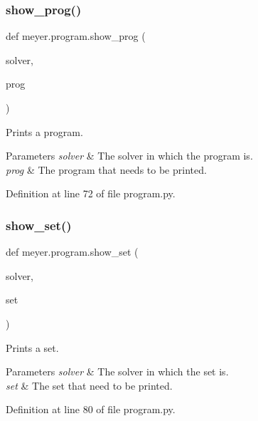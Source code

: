 \subsubsection{\texorpdfstring{show\+\_\+prog()}{show\_prog()}}
{\footnotesize\ttfamily def meyer.\+program.\+show\+\_\+prog (\begin{DoxyParamCaption}\item[{}]{solver,  }\item[{}]{prog }\end{DoxyParamCaption})}



Prints a program. 


\begin{DoxyParams}{Parameters}
{\em solver} & The solver in which the program is. \\
\hline
{\em prog} & The program that needs to be printed. \\
\hline
\end{DoxyParams}


Definition at line 72 of file program.\+py.

\mbox{\label{namespacemeyer_1_1program_a4dd6b1d1b136379bcee2fa37a407eff9}} 
\subsubsection{\texorpdfstring{show\+\_\+set()}{show\_set()}}
{\footnotesize\ttfamily def meyer.\+program.\+show\+\_\+set (\begin{DoxyParamCaption}\item[{}]{solver,  }\item[{}]{set }\end{DoxyParamCaption})}



Prints a set. 


\begin{DoxyParams}{Parameters}
{\em solver} & The solver in which the set is. \\
\hline
{\em set} & The set that need to be printed. \\
\hline
\end{DoxyParams}


Definition at line 80 of file program.\+py.

\mbox{\label{namespacemeyer_1_1program_a48c262752e496209621f5c6e0da3f8ad}} 
